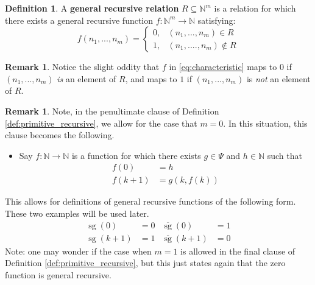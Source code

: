 \documentclass[12pt]{article}
\theoremstyle{plain}
\theoremstyle{definition}
\newtheorem{defn}[thm]{Definition} %
\newtheorem{remark}[thm]{Remark}
\newcommand{\bb}[1]{\mathbb{#1}}
\newcommand{\lto}{\longrightarrow}
\begin{document}
\begin{defn}
		A \textbf{general recursive relation} $R \subseteq \bb{N}^{m}$ is a relation for which there exists a general recursive function $f: \bb{N}^{m} \lto \bb{N}$ satisfying:
		\begin{equation}\label{eq:characteristic}
			f(n_1,...,n_m) = \begin{cases}
				0, & (n_1,...,n_m) \in R\\
				1, & (n_1,....,n_m) \not\in R
			\end{cases}
		\end{equation}
	\end{defn}
	\begin{remark}
		Notice the slight oddity that $f$ in \eqref{eq:characteristic} maps to $0$ if $(n_1,...,n_m)$ \emph{is} an element of $R$, and maps to $1$ if $(n_1,...,n_m)$ is \emph{not} an element of $R$.
	\end{remark}
	\begin{remark}
		Note, in the penultimate clause of Definition \ref{def:primitive_recursive}, we allow for the case that $m = 0$. In this situation, this clause becomes the following.
		\begin{itemize}
			\item Say $f: \bb{N} \lto \bb{N}$ is a function for which there exists $g \in \Psi$ and $h \in \bb{N}$ such that
			\begin{align}
				f(0) &= h\\
				f(k+1) &= g(k,f(k))
			\end{align}
		\end{itemize}
		This allows for definitions of general recursive functions of the following form. These two examples will be used later.
		\begin{align*}
			\operatorname{sg}(0) &= 0 & \overline{\operatorname{sg}}(0) &= 1\\
			\operatorname{sg}(k+1) &= 1 & \overline{\operatorname{sg}}(k+1) &= 0
		\end{align*}
		Note: one may wonder if the case when $m = 1$ is allowed in the final clause of Definition \ref{def:primitive_recursive}, but this just states again that the zero function is general recursive.
	\end{remark}
\end{document}
